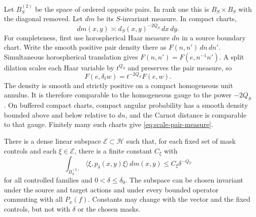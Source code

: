 Let $B_S^{(2)}$ be the space of ordered opposite pairs.  In rank one
this is $B_S\times B_S$ with the diagonal removed.  Let $dm$ be its
$S$-invariant measure.  In compact charts,
\begin{equation}
 dm(x,y)\asymp d_S(x,y)^{-2Q_S}\,dx\,dy.
 \label{eq:scale-pair-measure}
\end{equation}
For completeness, first use horospherical Haar measure $dn$ in a
source boundary chart. Write the smooth positive pair density there as
$F(n,n')\,dn\,dn'$. Simultaneous horospherical translation gives
$F(n,n')=F(e,n^{-1}n')$. A split dilation scales each Haar variable
by $t^{Q_S}$ and preserves the pair measure, so
\[
 F(e,\delta_t w)=t^{-2Q_S}F(e,w).
\]
The density is smooth and strictly positive on a compact homogeneous
unit annulus. It is therefore comparable to the homogeneous gauge to
the power $-2Q_S$. On buffered compact charts, compact angular
probability has a smooth density bounded above and below relative to
$dn$, and the Carnot distance is comparable to that gauge. Finitely
many such charts give \eqref{eq:scale-pair-measure}.

\begin{proposition}
\label{prop:scale-pair-estimate}
There is a dense linear subspace $\mathscr E\subset\mathcal H$ such
that, for each fixed set of mask controls and each $\xi\in\mathscr E$,
there is a finite constant $C_\xi$ with
\begin{equation}
 \int_{B_S^{(2)}}
  \langle\xi,p_\delta(x,y)\xi\rangle\,dm(x,y)
 \le C_\xi\delta^{-Q_T}
 \label{eq:input-10}
\end{equation}
for all controlled families and $0<\delta\le\delta_0$.
The subspace can be chosen invariant under the source and target
actions and under every bounded operator commuting with all
$P_x(f)$.  Constants may change with the vector and the fixed
controls, but not with $\delta$ or the chosen masks.
\end{proposition}

